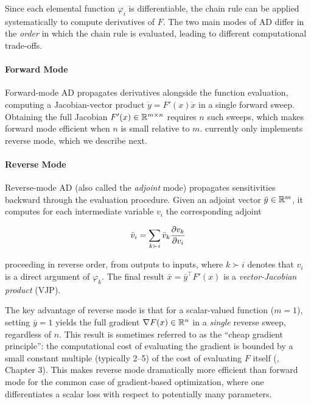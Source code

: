 Since each elemental function \(\varphi_i\) is differentiable, the chain rule can be applied systematically to compute derivatives of \(F\).
The two main modes of AD differ in the \emph{order} in which the chain rule is evaluated, leading to different computational trade-offs.

\paragraph{Forward Mode}\label{forward-mode}

Forward-mode AD propagates derivatives alongside the function evaluation, computing a Jacobian-vector product \(\dot{y} = F'(x) \dot{x}\) in a single forward sweep.
Obtaining the full Jacobian \(F'(x) \in \mathbb{R}^{m \times n}\) requires \(n\) such sweeps, which makes forward mode efficient when \(n\) is small relative to \(m\).
 currently only implements reverse mode, which we describe next.

\paragraph{Reverse Mode}\label{reverse-mode}

Reverse-mode AD (also called the \emph{adjoint} mode) propagates sensitivities backward through the evaluation procedure.
Given an adjoint vector \(\bar{y} \in \mathbb{R}^m\), it computes for each intermediate variable \(v_i\) the corresponding adjoint

\[\bar{v}_i = \sum_{k \succ i} \bar{v}_k \frac{\partial v_k}{\partial v_i}\]

proceeding in reverse order, from outputs to inputs, where \(k \succ i\) denotes that \(v_i\) is a direct argument of \(\varphi_k\).
The final result \(\bar{x} = \bar{y}^\top F'(x)\) is a \emph{vector-Jacobian product} (VJP).

The key advantage of reverse mode is that for a scalar-valued function (\(m = 1\)), setting \(\bar{y} = 1\) yields the full gradient \(\nabla F(x) \in \mathbb{R}^n\) in a \emph{single} reverse sweep, regardless of \(n\).
This result is sometimes referred to as the ``cheap gradient principle'': the computational cost of evaluating the gradient is bounded by a small constant multiple (typically 2--5) of the cost of evaluating \(F\) itself (\citet{ref-griewank2008evaluating}, Chapter 3).
This makes reverse mode dramatically more efficient than forward mode for the common case of gradient-based optimization, where one differentiates a scalar loss with respect to potentially many parameters.

